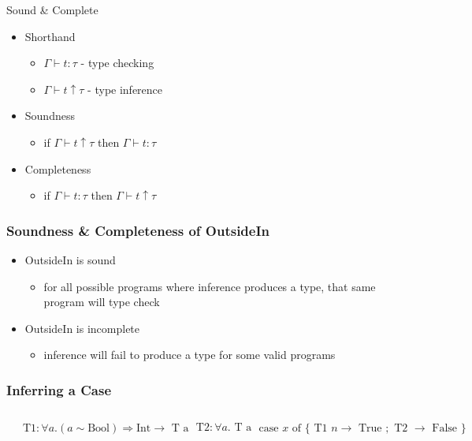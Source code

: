 \documentclass{beamer}
\newcommand\Fontvi{\fontsize{8}{7.2}\selectfont}
\begin{document}
\begin{frame}{Sound \& Complete}
\begin{itemize}
\item Shorthand
   \begin{itemize}
   \item $\Gamma \vdash t : \tau$ - type checking
   \item $\Gamma \vdash t \uparrow \tau$ - type inference
   \end{itemize}
\item Soundness
   \begin{itemize}
   \item if $\Gamma \vdash t \uparrow \tau$ then $\Gamma \vdash t : \tau$
   \end{itemize}
\item Completeness
   \begin{itemize}
   \item if $\Gamma \vdash t : \tau$ then $\Gamma \vdash t \uparrow \tau$
   \end{itemize}
\end{itemize}
\end{frame}

\begin{frame}
\frametitle{Soundness \& Completeness of OutsideIn}
\begin{itemize}
   \item OutsideIn is sound
      \begin{itemize}
         \item for all possible programs where inference produces a type, that same program will type check
      \end{itemize}
   \item OutsideIn is incomplete
      \begin{itemize}
         \item inference will fail to produce a type for some valid programs
      \end{itemize}
\end{itemize}
\end{frame}


\begin{frame}[fragile]
\frametitle{Inferring a Case}
\Fontvi
\begin{columns}[l]
  \column{1.3in}
  \begin{lstlisting}
data T a where
  T1 :: Int -> T Bool
  T2 :: T a

isT1 (T1 _) = True
isT1 T2 = False
\end{lstlisting}

\column{2.1in}
$\mbox{T1} : \forall a. (a \sim \mbox{Bool}) \Rightarrow \mbox{Int} \rightarrow \mbox{ T a}$

$\mbox{T2} : \forall a. \mbox{ T a}$

\vspace{3 mm}

$\mbox{case } x \mbox{ of } \{ \mbox{ T1 } n \rightarrow \mbox{ True }; \mbox{ T2 } \rightarrow \mbox{ False } \}$
\end{columns}
\end{frame}
\end{document}
